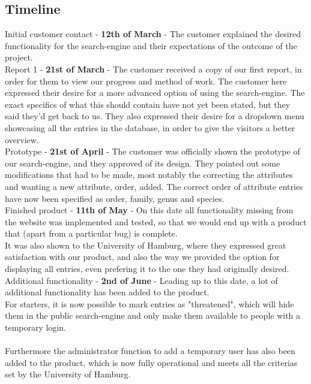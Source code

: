\documentclass[12pt,a4paper]{article}
\begin{document}
\subsection{Timeline}

	Initial customer contact - {\bf 12th of March} - The customer explained the desired functionality for the search-engine and their expectations of the outcome of the project. \\
	
	
	Report 1 - {\bf 21st of March} - The customer received a copy of our first report, in order for them to view our progress and method of work.
	The customer here expressed their desire for a more advanced option of using the search-engine. The exact specifics of what this should contain have not yet been stated, but they said they'd get back to us.
	They also expressed their desire for a dropdown menu showcasing all the entries in the database, in order to give the visitors a better overview.\\
	
	
	Prototype - {\bf 21st of April} - The customer was officially shown the prototype of our search-engine, and they approved of its design. They pointed out some modifications that had to be made, most notably the correcting the attributes and wanting a new attribute, order, added. The correct order of attribute entries have now been specified as order, family, genus and species.\\
	
	Finished product - {\bf 11th of May} - On this date all functionality missing from the website was implemented and tested, so that we would end up with a product that (apart from a particular bug) is complete.\\
	It was also shown to the University of Hamburg, where they expressed great satisfaction with our product, and also the way we provided the option for displaying all entries, even prefering it to the one they had originally desired.\\
	
	Additional functionality - {\bf 2nd of June} - Leading up to this date, a lot of additional functionality has been added to the product.\\
	For starters, it is now possible to mark entries as "threatened", which will hide them in the public search-engine and only make them available to people with a temporary login.\\
	\\Furthermore the administrator function to add a temporary user has also been added to the product, which is now fully operational and meets all the criterias set by the University of Hamburg.
\end{document}
